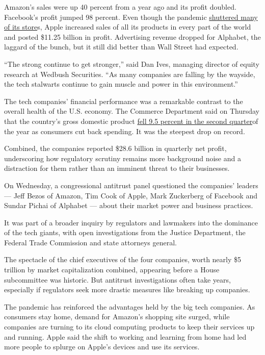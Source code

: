 Amazon's sales were up 40 percent from a year ago and its profit
doubled. Facebook's profit jumped 98 percent. Even though the pandemic
\href{https://www.nytimes3xbfgragh.onion/2020/03/14/technology/apple-stores-coronavirus.html}{shuttered
many of its store}s, Apple increased sales of all its products in every
part of the world and posted \$11.25 billion in profit. Advertising
revenue dropped for Alphabet, the laggard of the bunch, but it still did
better than Wall Street had expected.

``The strong continue to get stronger,'' said Dan Ives, managing
director of equity research at Wedbush Securities. ``As many companies
are falling by the wayside, the tech stalwarts continue to gain muscle
and power in this environment.''

The tech companies' financial performance was a remarkable contrast to
the overall health of the U.S. economy. The Commerce Department said on
Thursday that the country's gross domestic product
\href{https://www.nytimes3xbfgragh.onion/2020/07/30/business/economy/q2-gdp-coronavirus-economy.html?action=click\&module=Top\%20Stories\&pgtype=Homepage}{fell
9.5 percent in the second quarter}of the year as consumers cut back
spending. It was the steepest drop on record.

Combined, the companies reported \$28.6 billion in quarterly net profit,
underscoring how regulatory scrutiny remains more background noise and a
distraction for them rather than an imminent threat to their businesses.

On Wednesday, a congressional antitrust panel questioned the companies'
leaders --- Jeff Bezos of Amazon, Tim Cook of Apple, Mark Zuckerberg of
Facebook and Sundar Pichai of Alphabet --- about their market power and
business practices.

It was part of a broader inquiry by regulators and lawmakers into the
dominance of the tech giants, with open investigations from the Justice
Department, the Federal Trade Commission and state attorneys general.

The spectacle of the chief executives of the four companies, worth
nearly \$5 trillion by market capitalization combined, appearing before
a House subcommittee was historic. But antitrust investigations often
take years, especially if regulators seek more drastic measures like
breaking up companies.

The pandemic has reinforced the advantages held by the big tech
companies. As consumers stay home, demand for Amazon's shopping site
surged, while companies are turning to its cloud computing products to
keep their services up and running. Apple said the shift to working and
learning from home had led more people to splurge on Apple's devices and
use its services.


